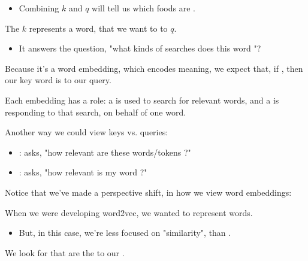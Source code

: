 \begin{itemize}
\begin{itemize}
                \item Combining $k$ and $q$ will tell us which foods are .\\

            \end{itemize}

            \begin{definition}
                The  $k$ represents a word, that we want to  to  $q$.

                \begin{itemize}
                    \item It answers the question, "what kinds of searches does this word "?
                \end{itemize}

                Because it's a word embedding, which encodes meaning, we expect that, if , then our key word is  to our query.
            \end{definition}
        \end{itemize}

        Each embedding has a role: a  is used to search for relevant words, and a  is responding to that search, on behalf of one word.

        \begin{concept}
            Another way we could view keys vs. queries:

            \begin{itemize}
                \item {}: asks, "how relevant are these words/tokens ?"

                \item {}: asks, "how relevant is my word ?"
            \end{itemize}
        \end{concept}


        \phantom{}

        Notice that we've made a perspective shift, in how we view word embeddings:\\

        \begin{concept}
            When we were developing word2vec, we wanted  to represent  words.

            \begin{itemize}
                \item But, in this case, we're less focused on "similarity", than .
            \end{itemize}

            We look for  that are the  to our .

        \end{concept}

